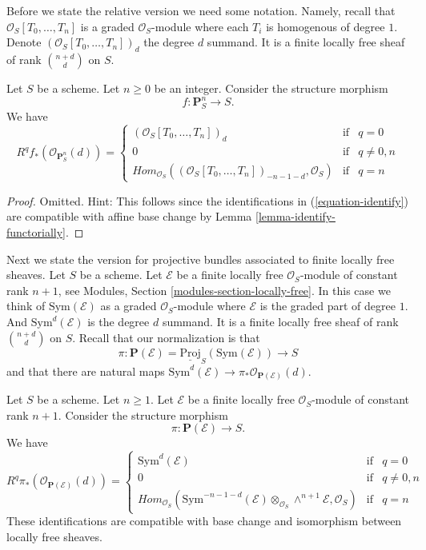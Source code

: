 \noindent
Before we state the relative version we need some notation.
Namely, recall that $\mathcal{O}_S[T_0, \ldots, T_n]$ is a graded
$\mathcal{O}_S$-module where each $T_i$ is homogenous of degree $1$.
Denote $(\mathcal{O}_S[T_0, \ldots, T_n])_d$ the degree $d$ summand.
It is a finite locally free sheaf of rank $\binom{n + d}{d}$ on $S$.

\begin{lemma}
\label{lemma-cohomology-projective-space-over-base}
Let $S$ be a scheme.
Let $n \geq 0$ be an integer.
Consider the structure morphism
$$
f : \mathbf{P}^n_S \longrightarrow S.
$$
We have
$$
R^qf_*(\mathcal{O}_{\mathbf{P}^n_S}(d)) =
\left\{
\begin{matrix}
(\mathcal{O}_S[T_0, \ldots, T_n])_d & \text{if} & q = 0 \\
0 & \text{if} & q \not = 0, n \\
\textit{Hom}_{\mathcal{O}_S}(
(\mathcal{O}_S[T_0, \ldots, T_n])_{- n - 1 - d}, \mathcal{O}_S)
& \text{if} & q = n
\end{matrix}
\right.
$$
\end{lemma}

\begin{proof}
Omitted. Hint: This follows since the identifications in
(\ref{equation-identify}) are compatible with affine base change
by Lemma \ref{lemma-identify-functorially}.
\end{proof}

\noindent
Next we state the version for projective bundles associated to finite locally
free sheaves. Let $S$ be a scheme. Let $\mathcal{E}$ be a finite locally
free $\mathcal{O}_S$-module of constant rank $n + 1$, see
Modules, Section \ref{modules-section-locally-free}.
In this case we think of $\text{Sym}(\mathcal{E})$ as a graded
$\mathcal{O}_S$-module where $\mathcal{E}$ is the graded part of degree $1$.
And $\text{Sym}^d(\mathcal{E})$ is the degree $d$ summand.
It is a finite locally free sheaf of rank $\binom{n + d}{d}$ on $S$.
Recall that our normalization is that
$$
\pi :
\mathbf{P}(\mathcal{E})
=
\underline{\text{Proj}}_S(\text{Sym}(\mathcal{E}))
\longrightarrow
S
$$
and that there are natural maps
$\text{Sym}^d(\mathcal{E}) \to \pi_*\mathcal{O}_{\mathbf{P}(\mathcal{E})}(d)$.

\begin{lemma}
\label{lemma-cohomology-projective-bundle}
Let $S$ be a scheme. Let $n \geq 1$.
Let $\mathcal{E}$ be a finite locally
free $\mathcal{O}_S$-module of constant rank $n + 1$.
Consider the structure morphism
$$
\pi : \mathbf{P}(\mathcal{E}) \longrightarrow S.
$$
We have
$$
R^q\pi_*(\mathcal{O}_{\mathbf{P}(\mathcal{E})}(d)) =
\left\{
\begin{matrix}
\text{Sym}^d(\mathcal{E}) & \text{if} & q = 0 \\
0 & \text{if} & q \not = 0, n \\
\textit{Hom}_{\mathcal{O}_S}(
\text{Sym}^{- n - 1 - d}(\mathcal{E})
\otimes_{\mathcal{O}_S}
\wedge^{n + 1}\mathcal{E},
\mathcal{O}_S)
& \text{if} & q = n
\end{matrix}
\right.
$$
These identifications are compatible with base change and
isomorphism between locally free sheaves.
\end{lemma}

